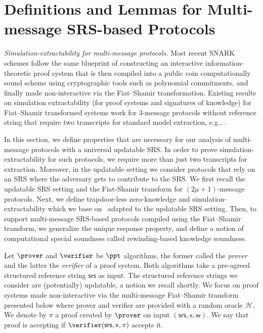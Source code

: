 \documentclass[10pt]{llncs}
\newcommand{\pcvarstyle}[1]{\mathsf{#1}}
\newcommand{\srs}{\pcvarstyle{srs}}
\newcommand{\zkproof}{\pi}
\newcommand{\ro}{\mathcal{H}}
\newcommand{\inp}{\pcvarstyle{x}}
\newcommand{\wit}{\pcvarstyle{w}}
\newcommand{\ourpar}[1] {\smallskip\noindent\emph{#1}}
\begin{document}
\section{Definitions and Lemmas for Multi-message SRS-based Protocols}
\label{sec:se_definitions}
\label{sec:preliminaries}



\ourpar{Simulation-extractability for multi-message protocols.}
Most recent SNARK schemes follow the same blueprint of constructing an interactive information-theoretic proof system 
that is then compiled into a public coin computationally sound scheme using cryptographic tools such as polynomial commitments,
and finally made non-interactive via the Fiat--Shamir transformation.
Existing results on simulation extractability (for proof systems and
signatures of knowledge) for Fiat--Shamir transformed systems work for $3$-message protocols without reference string that
require two transcripts for standard model extraction, e.g.,
\cite{JC:PoiSte00,INDOCRYPT:FKMV12,C:RotSeg21}.

In this section, we define properties that are necessary for our
analysis of multi-message protocols with a universal updatable SRS.  In order to
prove simulation-extractability for such protocols, we require more than just two
transcripts for extraction. Moreover, in the updatable setting we consider protocols
that rely on an SRS where the adversary gets to contribute to the SRS. We first recall the updatable SRS setting and the Fiat-Shamir transform for $(2\mu+1)$-message protocols.
Next, we define trapdoor-less zero-knowledge and simulation-extractability
which we base on~\cite{INDOCRYPT:FKMV12} adapted to the updatable SRS setting. Then,
to support multi-message SRS-based protocols compiled using the Fiat--Shamir transform,
we generalize the unique response property, and define a notion of computational special
soundness called rewinding-based knowledge soundness.\medskip


\noindent Let $\prover$ and $\verifier$ be $\ppt$ algorithms, the former called the \emph{prover}
and the latter the \emph{verifier} of a proof system. Both algorithms take a pre-agreed structured reference string $\srs$ as input. The structured reference strings we consider are (potentially) updatable, a notion we recall shortly.
%
We focus on proof systems made non-interactive via the multi-message Fiat--Shamir transform presented below where prover and
verifier are provided with a random oracle $\ro$. 
We denote by $\zkproof$ a proof created by $\prover$ on input
$(\srs, \inp, \wit)$. We say that proof is accepting if $\verifier(\srs, \inp,
\zkproof)$ accepts it.
\end{document}

